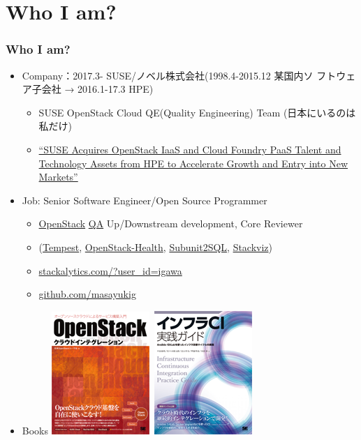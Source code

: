 \documentclass[aspectratio=169,11pt,hyperref={colorlinks=true}]{beamer}
\begin{document}
\section{Who I am?}
\begin{frame}
  \frametitle{Who I am?}
  \begin{itemize}
    \item Company：2017.3- SUSE/ノベル株式会社(1998.4-2015.12 某国内ソ
      フトウェア子会社 → 2016.1-17.3 HPE)
      \begin{itemize}
        \item SUSE OpenStack Cloud QE(Quality Engineering) Team (日本にいるのは私だけ)
        \item[]
          \href{https://www.suse.com/newsroom/post/2016/suse-acquires-openstack-iaas-and-cloud-foundry-paas-talent-and-technology-assets-from-hpe-to-accelerate-growth-and-entry-into-new-markets/}{``SUSE
            Acquires OpenStack IaaS and Cloud Foundry PaaS Talent and
            Technology Assets from HPE to Accelerate Growth and Entry
            into New Markets''}
      \end{itemize}
    \item Job: Senior Software Engineer/Open Source Programmer
      \begin{itemize}
        \item \href{https://www.openstack.org/}{OpenStack}
         \href{https://wiki.openstack.org/wiki/QA}{QA} Up/Downstream development, Core Reviewer
        \item[] (\href{https://docs.openstack.org/developer/tempest/}{Tempest},
         \href{http://status.openstack.org/openstack-health/}{OpenStack-Health},
         \href{https://docs.openstack.org/developer/subunit2sql/}{Subunit2SQL},
         \href{https://docs.openstack.org/developer/stackviz/}{Stackviz})
        \item \href{http://stackalytics.com/?user_id=igawa&release=all&metric=all}{stackalytics.com/?user\_id=igawa}
        \item \href{https://github.com/masayukig}{github.com/masayukig}
      \end{itemize}
    \item Books \includegraphics[scale=0.2]{OpenStack_Integration_book.png}~\includegraphics[scale=0.2]{InfraCI_book.png}

\end{itemize}
\end{frame}
\end{document}
